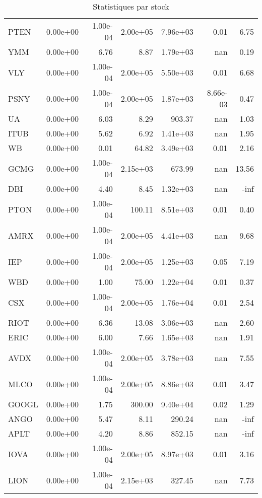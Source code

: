 \begin{table}[H]
\begin{tabular}{lrrrrrr}
PTEN & 0.00e+00 & 1.00e-04 & 2.00e+05 & 7.96e+03 & 0.01 & 6.75 \\
YMM & 0.00e+00 & 6.76 & 8.87 & 1.79e+03 & nan & 0.19 \\
VLY & 0.00e+00 & 1.00e-04 & 2.00e+05 & 5.50e+03 & 0.01 & 6.68 \\
PSNY & 0.00e+00 & 1.00e-04 & 2.00e+05 & 1.87e+03 & 8.66e-03 & 0.47 \\
UA & 0.00e+00 & 6.03 & 8.29 & 903.37 & nan & 1.03 \\
ITUB & 0.00e+00 & 5.62 & 6.92 & 1.41e+03 & nan & 1.95 \\
WB & 0.00e+00 & 0.01 & 64.82 & 3.49e+03 & 0.01 & 2.16 \\
GCMG & 0.00e+00 & 1.00e-04 & 2.15e+03 & 673.99 & nan & 13.56 \\
DBI & 0.00e+00 & 4.40 & 8.45 & 1.32e+03 & nan & -inf \\
PTON & 0.00e+00 & 1.00e-04 & 100.11 & 8.51e+03 & 0.01 & 0.40 \\
AMRX & 0.00e+00 & 1.00e-04 & 2.00e+05 & 4.41e+03 & nan & 9.68 \\
IEP & 0.00e+00 & 1.00e-04 & 2.00e+05 & 1.25e+03 & 0.05 & 7.19 \\
WBD & 0.00e+00 & 1.00 & 75.00 & 1.22e+04 & 0.01 & 0.37 \\
CSX & 0.00e+00 & 1.00e-04 & 2.00e+05 & 1.76e+04 & 0.01 & 2.54 \\
RIOT & 0.00e+00 & 6.36 & 13.08 & 3.06e+03 & nan & 2.60 \\
ERIC & 0.00e+00 & 6.00 & 7.66 & 1.65e+03 & nan & 1.91 \\
AVDX & 0.00e+00 & 1.00e-04 & 2.00e+05 & 3.78e+03 & nan & 7.55 \\
MLCO & 0.00e+00 & 1.00e-04 & 2.00e+05 & 8.86e+03 & 0.01 & 3.47 \\
GOOGL & 0.00e+00 & 1.75 & 300.00 & 9.40e+04 & 0.02 & 1.29 \\
ANGO & 0.00e+00 & 5.47 & 8.11 & 290.24 & nan & -inf \\
APLT & 0.00e+00 & 4.20 & 8.86 & 852.15 & nan & -inf \\
IOVA & 0.00e+00 & 1.00e-04 & 2.00e+05 & 8.97e+03 & 0.01 & 3.16 \\
LION & 0.00e+00 & 1.00e-04 & 2.15e+03 & 327.45 & nan & 7.73 \\
\bottomrule
\end{tabular}
\caption{Statistiques par stock}
\end{table}